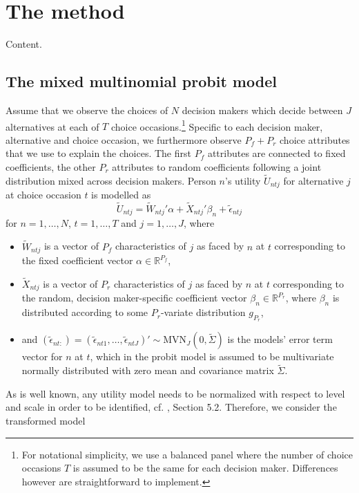 \documentclass[article]{jss}
\begin{document}
\section{The method} \label{sec:method}

Content.

\subsection{The mixed multinomial probit model} \label{subsec:mnp}


Assume that we observe the choices of $N$ decision makers which decide between $J$ alternatives at each of $T$ choice occasions.\footnote{For notational simplicity, we use a balanced panel where the number of choice occasions $T$ is assumed to be the same for each decision maker. Differences however are straightforward to implement.} Specific to each decision maker, alternative and choice occasion, we furthermore observe $P_f+P_r$ choice attributes that we use to explain the choices. The first $P_f$ attributes are connected to fixed coefficients, the other $P_r$ attributes to random coefficients following a joint  distribution mixed across decision makers. Person $n$'s utility $\tilde{U}_{ntj}$ for alternative $j$ at choice occasion $t$ is modelled as
\begin{equation}
\tilde{U}_{ntj} = \tilde{W}_{ntj}'\alpha + \tilde{X}_{ntj}'\beta_n + \tilde{\epsilon}_{ntj}
\end{equation}
for $n=1,\dots,N$, $t=1,\dots,T$ and $j=1,\dots,J$, where
\begin{itemize}
	\item $\tilde{W}_{ntj}$ is a vector of $P_f$ characteristics of $j$ as faced by  $n$ at $t$ corresponding to the fixed coefficient vector $\alpha \in {\mathbb R}^{P_f}$,
	\item $\tilde{X}_{ntj}$ is a vector of $P_r$ characteristics of $j$ as faced by  $n$ at $t$ corresponding to the random, decision maker-specific coefficient vector $\beta_n \in {\mathbb R}^{P_r}$, where $\beta_n$ is distributed according to some $P_r$-variate distribution $g_{P_r}$,
	\item and $(\tilde{\epsilon}_{nt:}) = (\tilde{\epsilon}_{nt1},\dots,\tilde{\epsilon}_{ntJ})' \sim \text{MVN}_J (0,\tilde{\Sigma})$ is the models' error term vector for $n$ at $t$, which in the probit model is assumed to be multivariate normally distributed with zero mean and covariance matrix $\tilde{\Sigma}$.
\end{itemize}
As is well known, any utility model needs to be normalized with respect to level and scale in order to be identified, cf. \cite{Train:09}, Section 5.2. Therefore, we consider the transformed model
\end{document}
